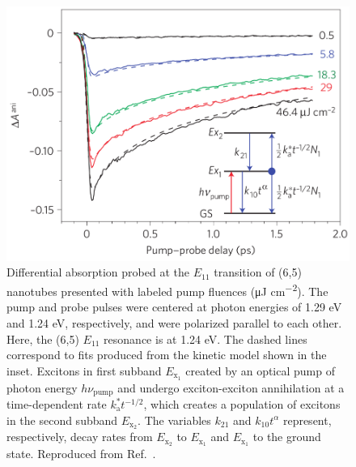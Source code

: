 \begin{figure}[H]
	\centering
	\includegraphics[scale=1.2]{images/chapter_prior_works/dtt_2_luer_2009}
	\caption{Differential absorption probed at the $E_{11}$ transition of (6,5) nanotubes presented with labeled pump fluences (\si{\micro \joule} \si{\cm^{-2}}). The pump and probe pulses were centered at photon energies of 1.29 eV and 1.24 eV, respectively, and were polarized parallel to each other. Here, the (6,5) $E_{11}$ resonance is at 1.24 eV. The dashed lines correspond to fits produced from the kinetic model shown in the inset. Excitons in first subband $E_{\text{x}_1}$ created by an optical pump of photon energy $h \nu_\text{pump}$ and undergo exciton-exciton annihilation at a time-dependent rate $k_\text{a}^* t^{-1/2}$, which creates a population of excitons in the second subband $E_{\text{x}_2}$. The variables $k_{21}$ and $k_{10}t^{\alpha}$ represent, respectively, decay rates from $E_{\text{x}_2}$ to $E_{\text{x}_1}$ and $E_{\text{x}_1}$ to the ground state. Reproduced from Ref.\ \cite{luer2009size}.}
	\label{fig:dtt_luer_2009}
\end{figure}

